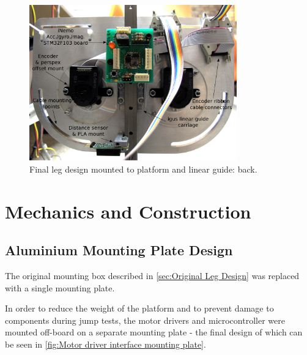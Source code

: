 \begin{figure}
\centering
\includegraphics[width=0.8\textwidth]{images/mechanical/encoder-mount-annotated} 
\caption{Final leg design mounted to platform and linear guide: back.}
\label{fig:Final leg design - back}
\end{figure}

\section{Mechanics and Construction}

\subsection{Aluminium Mounting Plate Design}
\label{sec:Alumnium Mounting Plate Design}

The original mounting box described in \cref{sec:Original Leg Design} was replaced with a single mounting plate. 

In order to reduce the weight of the platform and to prevent damage to components during jump tests, the motor drivers and microcontroller were mounted off-board on a separate mounting plate - the final design of which can be seen in \cref{fig:Motor driver interface mounting plate}.

